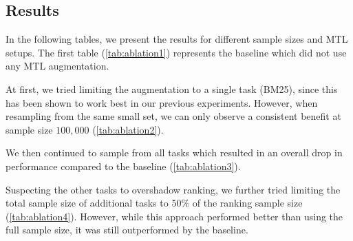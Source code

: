 \subsection{Results}
In the following tables, we present the results for different sample sizes and MTL setups. The first table (\autoref{tab:ablation1}) represents the baseline which did not use any MTL augmentation.

At first, we tried limiting the augmentation to a single task (BM25), since this has been shown to work best in our previous experiments. However, when resampling from the same small set, we can only observe a consistent benefit at sample size $100,000$ (\autoref{tab:ablation2}).

We then continued to sample from all tasks which resulted in an overall drop in performance compared to the baseline (\autoref{tab:ablation3}).

Suspecting the other tasks to overshadow ranking, we further tried limiting the total sample size of additional tasks to $50\%$ of the ranking sample size (\autoref{tab:ablation4}). However, while this approach performed better than using the full sample size, it was still outperformed by the baseline.

